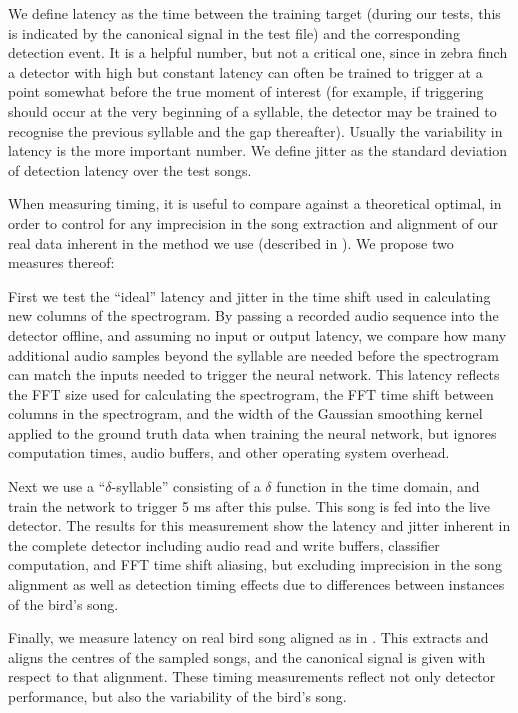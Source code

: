 \documentclass[10pt,letterpaper]{article}
\begin{document}
We define latency as the time between the training target (during our tests, this is indicated by the canonical
signal in the test file) and the corresponding detection event.  It is a helpful number,
but not a critical one, since in zebra finch a detector with high but
constant latency can often be trained to trigger at a point somewhat
before the true moment of interest (for example, if triggering should
occur at the very beginning of a syllable, the detector may be trained to recognise the previous syllable and the gap thereafter).  Usually the variability in latency is the more important number.  We define jitter as the standard deviation of detection latency over the test songs.

When measuring timing, it is useful to compare against a theoretical
optimal, in order to control for any imprecision in the song
extraction and alignment of our real data inherent in the method we
use (described in \cite{Poole2012}).  We propose two measures thereof:

First we test the ``ideal'' latency and jitter in the time shift used
in calculating new columns of the spectrogram. By passing a recorded
audio sequence into the detector offline, and assuming no input or
output latency, we compare how many additional audio samples beyond
the syllable are needed before the spectrogram can match the inputs
needed to trigger the neural network.  This latency reflects the FFT
size used for calculating the spectrogram, the FFT time shift between
columns in the spectrogram, and the width of the Gaussian smoothing
kernel applied to the ground truth data when training the neural
network, but ignores computation times, audio buffers, and other
operating system overhead.

Next we use a ``$\delta$-syllable'' consisting of a $\delta$ function
in the time domain, and train the network to trigger 5 ms after this
pulse.  This song is fed into the live detector.  The results for this
measurement show the latency and jitter inherent in the complete
detector including audio read and write buffers, classifier
computation, and FFT time shift aliasing, but excluding imprecision in
the song alignment as well as detection timing effects due to
differences between instances of the bird's song.

Finally, we measure latency on real bird song aligned as in
\cite{Poole2012}.  This extracts and aligns the centres of the sampled
songs, and the canonical signal is given with respect to that
alignment.  These timing measurements reflect not only detector
performance, but also the variability of the bird's song.
\end{document}
